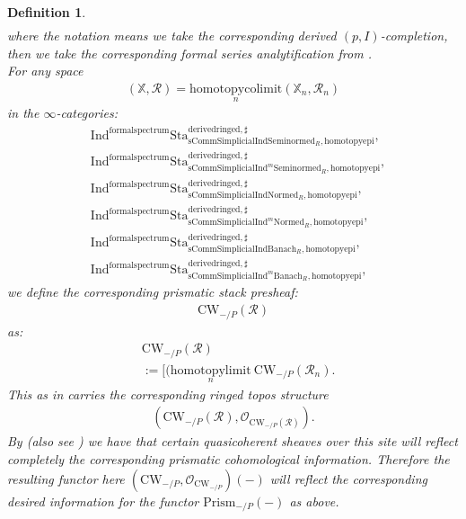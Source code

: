 \documentclass[12pt]{book}
\newtheorem{definition}{Definition}
\begin{document}
\begin{definition}
\begin{align}
\end{align}
where the notation means we take the corresponding derived $(p,I)$-completion, then we take the corresponding formal series analytification from \cite[4.2]{BBM}.\\
For any space
\begin{align}
(\mathbb{X},\mathcal{R})=\underset{n}{\mathrm{homotopycolimit}}(\mathbb{X}_n,\mathcal{R}_n)	
\end{align}
in the $\infty$-categories:
\begin{align}
&\mathrm{Ind}^\mathrm{formalspectrum}\mathrm{Sta}^\mathrm{derivedringed,\sharp}_{\mathrm{sComm}\mathrm{Simplicial}\mathrm{Ind}\mathrm{Seminormed}_R,\mathrm{homotopyepi}},\\
&\mathrm{Ind}^\mathrm{formalspectrum}\mathrm{Sta}^\mathrm{derivedringed,\sharp}_{\mathrm{sComm}\mathrm{Simplicial}\mathrm{Ind}^m\mathrm{Seminormed}_R,\mathrm{homotopyepi}},\\
&\mathrm{Ind}^\mathrm{formalspectrum}\mathrm{Sta}^\mathrm{derivedringed,\sharp}_{\mathrm{sComm}\mathrm{Simplicial}\mathrm{Ind}\mathrm{Normed}_R,\mathrm{homotopyepi}},\\
&\mathrm{Ind}^\mathrm{formalspectrum}\mathrm{Sta}^\mathrm{derivedringed,\sharp}_{\mathrm{sComm}\mathrm{Simplicial}\mathrm{Ind}^m\mathrm{Normed}_R,\mathrm{homotopyepi}},\\
&\mathrm{Ind}^\mathrm{formalspectrum}\mathrm{Sta}^\mathrm{derivedringed,\sharp}_{\mathrm{sComm}\mathrm{Simplicial}\mathrm{Ind}\mathrm{Banach}_R,\mathrm{homotopyepi}},\\
&\mathrm{Ind}^\mathrm{formalspectrum}\mathrm{Sta}^\mathrm{derivedringed,\sharp}_{\mathrm{sComm}\mathrm{Simplicial}\mathrm{Ind}^m\mathrm{Banach}_R,\mathrm{homotopyepi}},	
\end{align}
we define the corresponding prismatic stack presheaf:
\begin{align}
\mathrm{CW}_{-/P}(\mathcal{R})
\end{align}
as:
\begin{align}
&\mathrm{CW}_{-/P}(\mathcal{R})\\
&:=[(\underset{n}{\mathrm{homotopylimit}}~ \mathrm{CW}_{-/P}(\mathcal{R}_n).	
\end{align}
This as in \cite[Definition 3.1, Variant 5.1]{BL} carries the corresponding ringed topos structure 
\begin{align}
(\mathrm{CW}_{-/P}(\mathcal{R}),\mathcal{O}_{\mathrm{CW}_{-/P}(\mathcal{R})}). 
\end{align}
By \cite[Proposition 8.15]{BL} (also see \cite{Dr1}) we have that certain quasicoherent sheaves over this site will reflect completely the corresponding prismatic cohomological information. Therefore the resulting functor here $(\mathrm{CW}_{-/P},\mathcal{O}_{\mathrm{CW}_{-/P}})(-)$ will reflect the corresponding desired information for the functor $\mathrm{Prism}_{-/P}(-)$ as above.
\end{definition}
\end{document}

